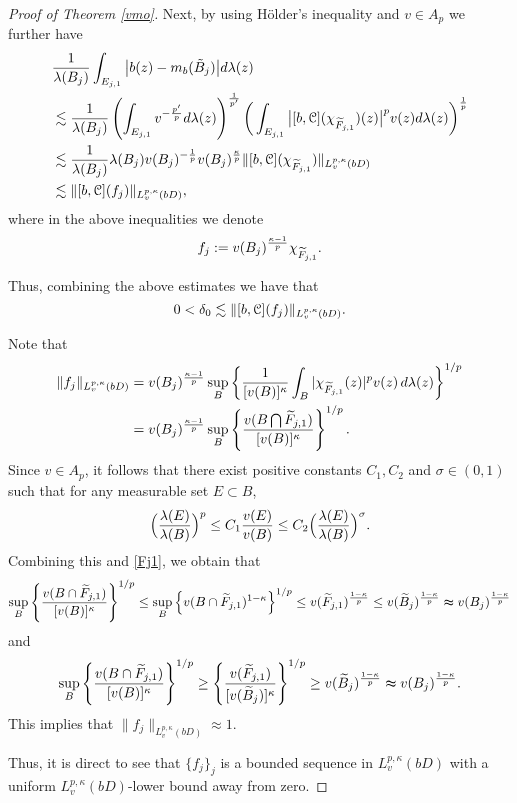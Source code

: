 \documentclass[11pt,a4paper]{amsart}
\numberwithin{equation}{section}
\begin{document}
{\begin{proof}[Proof of   Theorem \ref{vmo}]
Next, by using H\"older's
inequality and $v\in A_p$ we further have
\begin{align*}
&{1\over \lambda(B_j)}\int_{E_{j,1}}\big|b(z)-m_b(\tilde B_j)\big|d\lambda(z)\\
&\lesssim
{1\over \lambda(B_j) } \left(\int_{E_{j,1}}v^{-{p'\over p}}d\lambda(z)\right)^{1\over p'}\bigg( \int_{E_{j,1}}\big|[b, \EuScript C](\chi_{\widetilde F_{j,1}})(z)\big|^pv(z)d\lambda(z) \bigg)^{1\over p}\\
&\lesssim
{1\over \lambda(B_j) }\lambda(B_j) v(B_j)^{-{1\over p}}v(B_j)^{{\kappa\over p}}\|[b, \EuScript C](\chi_{\widetilde F_{j,1}})\|_{L_v^{p,\kappa}(bD)}\\
&\lesssim \|[b, \EuScript C](f_j)\|_{L_v^{p,\kappa}(bD)},
\end{align*}
where in the above inequalities
we denote
$$ f_j := v(B_j)^{{\kappa-1\over p}}\chi_{\widetilde F_{j,1}} .$$

Thus, combining the above estimates we have that
$$ 0<\delta_0  \lesssim \|[b, \EuScript C](f_j)\|_{L_v^{p,\kappa}(bD)}.$$

Note that
\begin{align*}
\|f_j\|_{L_v^{p,\kappa}(bD)}&=v(B_j)^{{\kappa-1\over p}}\sup_{B}
\left\{\frac{1}{[v(B)]^\kappa}\int_{B}|\chi_{\widetilde F_{j,1}}(z)|^pv(z)\,d\lambda(z)\right\}^{1/p}\\
&=v(B_j)^{{\kappa-1\over p}}\sup_{B}
\left\{\frac{v(B\bigcap \widetilde F_{j,1})}{[v(B)]^\kappa} \right\}^{1/p}.
\end{align*}
Since $v\in A_p$, it follows that there exist positive constants $C_1,C_2$ and $\sigma\in (0,1)$ such that for any measurable set $E\subset B$,
$$\Big({\lambda(E)\over \lambda(B)}\Big)^p\leq C_1{v(E)\over v(B)}\leq C_2\Big({\lambda(E)\over \lambda(B)}\Big)^{\sigma}.$$
Combining this and \eqref{Fj1}, we obtain that
$$\sup_{B}
\left\{\frac{v(B\cap \widetilde F_{j,1})}{[v(B)]^\kappa} \right\}^{1/p}\leq \sup_{B}
\left\{ v(B\cap \widetilde F_{j,1})^{1-\kappa}  \right\}^{1/p}\leq   v( \widetilde F_{j,1})^{1-\kappa\over p}\leq   v( \widetilde B_{j })^{1-\kappa\over p}\thickapprox v(   B_{j })^{1-\kappa\over p}   $$
and
 $$\sup_{B}
\left\{\frac{v(B\cap \widetilde F_{j,1})}{[v(B)]^\kappa} \right\}^{1/p}\geq \left\{\frac{v(  \widetilde F_{j,1})}{[v(\widetilde B_{j })]^\kappa} \right\}^{1/p} \geq   v( \widetilde B_{j })^{1-\kappa\over p}\thickapprox v(   B_{j })^{1-\kappa\over p}.   $$
This implies that
$
\|f_j\|_{L_v^{p,\kappa}(bD)} \approx 1.
$


Thus, it is direct to see that $\{f_j\}_j$ is a bounded sequence in $L_v^{p,\kappa}(bD)$ with a uniform $L_v^{p,\kappa}(bD)$-lower bound away from zero.



\end{proof}}
\end{document}
